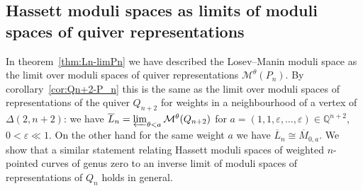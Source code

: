 \documentclass[ALCO,ThmDefs,Unicode,epreuves]{cedram}
\def\Q{\mathds Q}
\begin{document}
\subsection{Hassett moduli spaces as limits of moduli spaces of quiver representations}

In theorem~\ref{thm:Ln-limPn} we have described the Losev--Manin moduli space
as the limit over moduli spaces of quiver representations $\mathcal M^\theta(P_n)$.
By corollary~\ref{cor:Qn+2-P_n} this is the same as the limit over 
moduli spaces of representations of the quiver $Q_{n+2}$ for weights 
in a neighbourhood of a vertex of $\Delta(2,n+2)$: we have 
$\overline{L}_n=\varprojlim_{\theta<a}\mathcal M^\theta(Q_{n+2})$
for $a=(1,1,\varepsilon,\ldots,\varepsilon)\in\Q^{n+2}$, $0<\varepsilon\ll1$.
On the other hand for the same weight $a$ we have $\overline{L}_n\cong\overline{M}_{0,a}$.
We show that a similar statement relating Hassett moduli spaces of 
weighted $n$-pointed curves of genus zero to an inverse limit of 
moduli spaces of representations of $Q_n$ holds in general.
\end{document}
